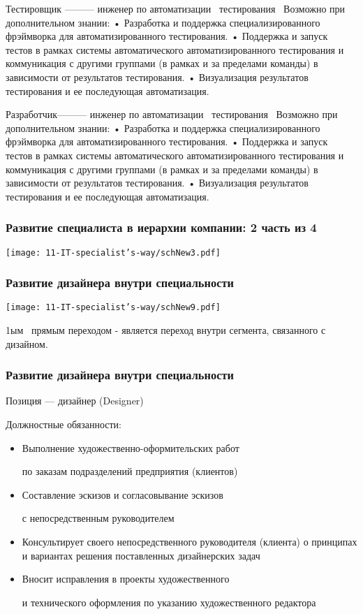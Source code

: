 \documentclass{../industrial-development}
\begin{document}
Тестировщик --------- инженер по автоматизации~\cite{hh} тестирования~\cite{itcf}
Возможно при дополнительном знании:
•	Разработка и поддержка специализированного фрэймворка для автоматизированного тестирования.
•	Поддержка и запуск тестов в рамках системы автоматического автоматизированного тестирования и коммуникация с другими группами (в рамках и за пределами команды) в зависимости от результатов тестирования.
•	Визуализация результатов тестирования и ее последующая автоматизация.


Разработчик--------- инженер по автоматизации~\cite{hh} тестирования~\cite{itcf}
Возможно при дополнительном знании:
•	Разработка и поддержка специализированного фрэймворка для автоматизированного тестирования.
•	Поддержка и запуск тестов в рамках системы автоматического автоматизированного тестирования и коммуникация с другими группами (в рамках и за пределами команды) в зависимости от результатов тестирования.
•	Визуализация результатов тестирования и ее последующая автоматизация.


\begin{frame} \frametitle{Развитие  специалиста в иерархии компании: 2 часть из 4 }
  \centerline{\texttt{[image: 11-IT-specialist's-way/schNew3.pdf]}}
\end{frame}

\begin{frame} \frametitle{Развитие дизайнера внутри специальности}
  \centerline{\texttt{[image: 11-IT-specialist's-way/schNew9.pdf]}}
\end{frame}

\lecturenotes

 1ым~\cite{mc} прямым переходом  - является переход внутри сегмента, связанного с дизайном.

\begin{frame} \frametitle{Развитие дизайнера внутри специальности}
 \begin{block}{}
  \alert{Позиция --- дизайнер (Designer)}

Должностные обязанности: 
  \end{block}
  \begin{itemize}
  \item  Выполнение художественно-оформительских работ 

по заказам подразделений предприятия (клиентов)
  \item  Составление эскизов и согласовывание эскизов 

с непосредственным руководителем 
  \item Консультирует своего непосредственного руководителя (клиента) о принципах и вариантах решения поставленных дизайнерских задач
 \item  Вносит исправления в проекты художественного 

и технического оформления по указанию художественного редактора
  \end{itemize}
\end{frame}
\end{document}
